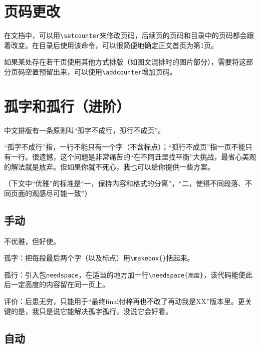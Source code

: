 \documentclass[10pt,openany]{book}
\begin{document}
\begin{sloppypar}
    

    \section{页码更改}

    在文档中，可以用\texttt{\textbackslash{}setcounter}来修改页码，后续页的页码和目录中的页码都会跟着改变。在目录后使用该命令，可以很简便地确定正文首页为第1页。

    

    如果某处存在若干页使用其他方式排版（如图文混排时的图片部分），需要将这部分页码空置预留出来，可以使用\texttt{\textbackslash{}addcounter}增加页码。

    

    \section{孤字和孤行（进阶）}

    中文排版有一条原则叫“孤字不成行，孤行不成页”。

    “孤字不成行”指，一行不能只有一个字（不含标点）；“孤行不成页”指一页不能只有一行。很遗憾，这个问题是非常痛苦的“在不同丑里找平衡”大挑战，最省心美观的解法就是放弃。但如果你就不死心，我也可以给你提供一些方案。

    （下文中“优雅”的标准是“一，保持内容和格式的分离”，“二，使得不同段落、不同页面的观感尽可能一致”）

    \subsection{手动}

    不优雅，但好使。

    孤字：把每段最后两个字（以及标点）用\texttt{\textbackslash{}makebox\{\}}括起来。

    孤行：引入包\texttt{needspace}，在适当的地方加一行\texttt{\textbackslash{}needspace\{高度\}}，该代码能使此后一定高度的内容留在同一页上。

    评价：后患无穷，只能用于“最终final付梓再也不改了再动我是XX”版本里。更关键的是，我只是说它能解决孤字孤行，没说它会好看。

    \subsection{自动}


\end{sloppypar}
\end{document}
